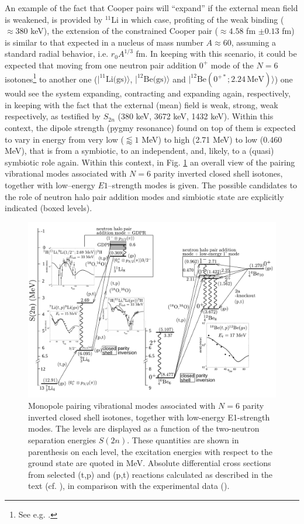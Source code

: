   An example of the fact that Cooper pairs will ``expand'' if the external mean field is weakened, is provided by $^{11}$Li in which case, profiting of the weak binding ($\approx 380$ keV), the extension of the constrained Cooper  pair ($\approx 4.58 $ fm $\pm 0.13$ fm)   is similar to that expected in a nucleus of mass number $A\approx 60$, assuming a standard radial behavior, i.e. $r_0 A^{1/3}$ fm. In keeping with this scenario, it could be expected that moving from one neutron pair addition $0^+$ mode of the $N=6$ isotones\footnote{See e.g. \cite{Gori:04}.} to another one ($|^{11}\text{Li(gs)}\rangle$, $|^{12}\text{Be(gs)}\rangle$ and $|^{12}\text{Be}(0^{+*};2.24\,\text{MeV})\rangle$) one would see the system expanding, contracting and expanding again, respectively, in keeping with the fact that the external (mean) field is weak, strong, weak respectively, as testified by $S_{2n}$ (380 keV, 3672 keV, 1432 keV). Within this context,  the dipole  strength (pygmy resonance) found on top of them is expected to vary in  energy from very low ($\lessapprox1$ MeV) to high (2.71 MeV) to low (0.460 MeV), that is from a symbiotic, to an independent, and, likely, to a (quasi) symbiotic role again.
Within this context, in Fig. \ref{fig3.8.1} an overall view of the pairing vibrational modes associated with $N=6$ parity inverted closed shell isotones, together with low--energy $E1$--strength modes is given. The possible candidates to the role of neutron halo pair addition modes and simbiotic state are explicitly indicated (boxed levels).
   \begin{figure}
   	\centerline{\includegraphics*[width=\textwidth,angle=0.3]{nutshell/figs/fig3_8_1}}
   	\caption{Monopole pairing vibrational modes associated with 
   		$N=6$ parity inverted closed shell isotones, together with low-energy E1-strength modes. 
   		The levels are  displayed as a function of the two-neutron separation energies $S(2n)$. 
   		These quantities are shown in parenthesis on each level, the excitation energies with respect to the ground state are quoted in MeV. 
   		Absolute differential cross sections from selected (t,p) and (p,t) reactions calculated as described in the text (cf. \cite{Potel:10,Potel:14}), 
   		in comparison with the experimental data (\cite{Young:71,Fortune:94}).}\label{fig3.8.1}
   \end{figure}
